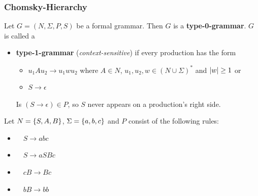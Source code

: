 \documentclass{beamer}
\DeclareMathOperator{\countL}{count}
\begin{document}
	\begin{frame} \frametitle{Chomsky-Hierarchy \cite{baader}}
		Let $G = (N,\Sigma,P,S)$ be a formal grammar. 
		Then $G$ is a \textbf{type-0-grammar}. \pause $G$ is called a
		\begin{itemize}
			\item \textbf{type-1-grammar} (\textit{context-sensitive}) if every production has the form
			\begin{itemize}
				\item $u_1 A u_2 \to u_1 w u_2$ where $A \in N$, $u_1, u_2, w \in (N \cup \Sigma)^\ast$ and $\left| w \right| \ge 1$ or
				\item $S \to \epsilon$
			\end{itemize} 
			Is $(S \to \epsilon) \in P$, so $S$ never appears on a production's right side.
		\end{itemize}
	
		\pause
	
		\begin{example}[$L(G) = \countL_3$]
			Let $N = \left\{ S,A,B \right\}$, $\Sigma = \left\{ a,b,c \right\}$ and $P$ consist of the following rules: \\[-1em]	
			\begin{multicols}{3}
				\begin{itemize}
					\item {} $\quad S \to abc$ 
					\item {} $\quad S \to aSBc$
					\item {} $\quad cB \to Bc$
					\item {} $\quad bB \to bb$
				\end{itemize}
			\end{multicols}
		\end{example}
	\end{frame}
\end{document}
